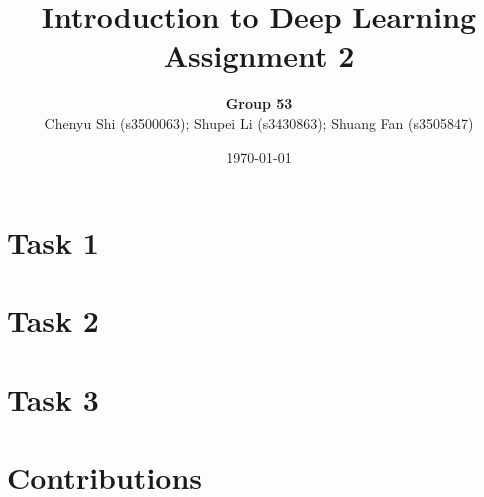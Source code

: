 \documentclass{article}
\title{Introduction to Deep Learning\\Assignment 2} %
\author{\textbf{Group 53}\\Chenyu Shi (s3500063); Shupei Li (s3430863); Shuang Fan (s3505847)} %
\date{\today} %
\begin{document}

\maketitle %

\section*{Task 1}

\section*{Task 2}

\section*{Task 3}

\section*{Contributions}
\end{document}
